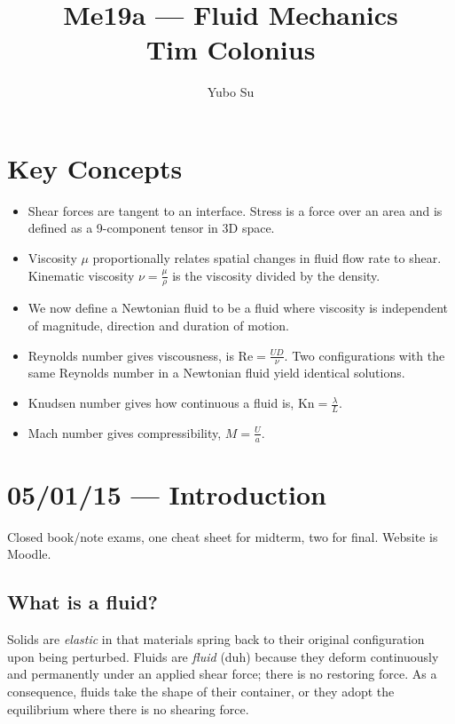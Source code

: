 \documentclass[10pt]{report}
\begin{document}
\title{Me19a --- Fluid Mechanics\\ Tim Colonius}
\author{Yubo Su}
\date{}

\maketitle
\tableofcontents

\chapter{Key Concepts}

\begin{itemize}
    \item Shear forces are tangent to an interface. Stress is a force over an area and is defined as a 9-component tensor in 3D space.
    \item Viscosity $\mu$ proportionally relates spatial changes in fluid flow rate to shear. Kinematic viscosity $\nu = \frac{\mu}{\rho}$ is the viscosity divided by the density.
    \item We now define a Newtonian fluid to be a fluid where viscosity is independent of magnitude, direction and duration of motion.
    \item Reynolds number gives viscousness, is $\mathrm{Re} = \frac{UD}{\nu}$. Two configurations with the same Reynolds number in a Newtonian fluid yield identical solutions.
    \item Knudsen number gives how continuous a fluid is, $\mathrm{Kn} = \frac{\lambda}{L}$.
    \item Mach number gives compressibility, $M = \frac{U}{a}$.
\end{itemize}

\chapter{05/01/15 --- Introduction}

Closed book/note exams, one cheat sheet for midterm, two for final. Website is Moodle.

\section{What is a fluid?}

Solids are \emph{elastic} in that materials spring back to their original configuration upon being perturbed. Fluids are \emph{fluid} (duh) because they deform continuously and permanently under an applied shear force; there is no restoring force. As a consequence, fluids take the shape of their container, or they adopt the equilibrium where there is no shearing force.
\end{document}
